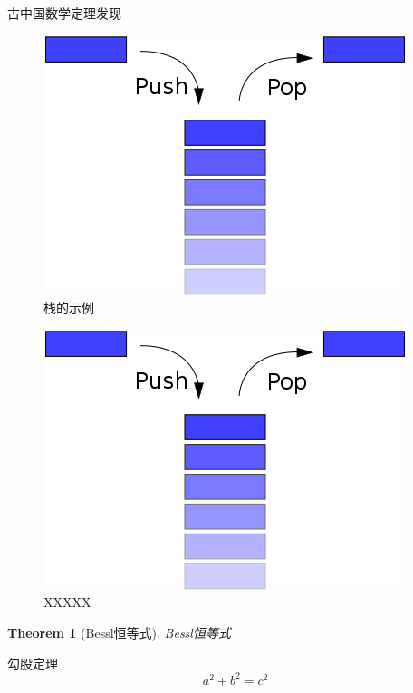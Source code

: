 \documentclass{beamer}
\newtheorem{theo}{Theorem}[section]
\begin{document}
\begin{frame}{古中国数学}{定理发现}
    \begin{minipage}{0.5\textwidth}
    \begin{figure}
    \centering
    \includegraphics[width=\textwidth]{stack.png}
    \caption{栈的示例}
        \end{figure}
    \end{minipage}%
    \begin{minipage}{0.5\textwidth}
    \begin{figure}
    \centering
    \includegraphics[width=\textwidth]{stack.png}
    \caption{XXXXX}
    \end{figure}
    \end{minipage}
\end{frame}

\begin{frame}
    \begin{theo}[Bessl恒等式]
        Bessl恒等式
    \end{theo}
    \begin{block}{勾股定理}
        \begin{equation*}
            a^2+b^2=c^2
        \end{equation*}
    \end{block}
\end{frame}
\end{document}
